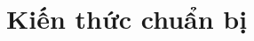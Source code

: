 \documentclass[class=linearalgebra,crop=false]{standalone}
\begin{document}
\chapter{Kiến thức chuẩn bị}
\end{document}
